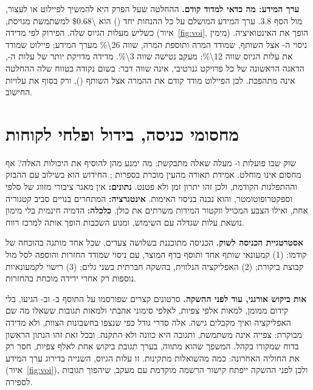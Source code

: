 \textbf{ערך המידע: מה כדאי למדוד קודם.} ההחלטה שעל הפרק היא להמשיך לפיילוט או לעצור, מול הסף \num{3.8}. ערך המידע המושלם על כל ההנחות יחד () הוא \num{\$0.68} למשתמשת מגויסת, כשליש מעלות הגיוס שלה. הפירוק לפי מדידה (איור~\ref{fig:voi}, מימין) הופך את האינטואיציה. ניסוי ה- אצל השותף, שמודד המרה ותוספת המרה, שווה \num{26\%} מערך המידע; פיילוט שמודד את עלות הגיוס שווה \num{12\%}; מעקב נטישה שווה \num{3\%}. מדידה מדויקת יותר של עלות ה-, הדאגה הראשונה של כל פרויקט גנרטיבי, אינה שווה דבר: בשום נקודה בטווח שלה ההחלטה אינה מתהפכת. לכן הפיילוט מודד קודם את ההמרה אצל השותף (), ורק בסוף את עלויות החישוב.

\section{מחסומי כניסה, בידול ופלחי לקוחות}
\label{sec:moat}

שוק שבו פועלות  ו- מעלה שאלה מתבקשת: מה ימנע מהן להוסיף את היכולות האלה? אף מחסום אינו מוחלט. אמידת תאורה מהעין מוכרת בספרות \cite{nishino2004eyes}; החידוש הוא בשילוב עם ההבזק וההתפלגות הקודמת, ולכן זהו יתרון זמן ולא פטנט. \textbf{נתונים:} אין מאגר ציבורי מזווג של סלפי וספקטרופוטומטר, והוא נבנה בניסוי האימות. \textbf{אינטגרציה:} המתחרים בנויים סביב קטגוריה אחת, ואילו הצבע המכויל ווקטור המידות משרתים את כולן. \textbf{כלכלה:} הדמיה חינמית בלי מימון נושאת עלות שגדלה עם השימוש, ומנוע השכבות הופך אותה למרכז רווח.

\textbf{אסטרטגיית הכניסה לשוק.} הכניסה מתוכננת בשלושה צעדים, שכל אחד מותנה בהוכחה של קודמו: (\num{1}) קמעונאי שותף אחד ותוסף בדף המוצר, עם ניסוי  שמודד החזרות והוספה לסל מול קבוצת ביקורת; (\num{2}) האפליקציה הנלווית, בהשקה חברתית בשני גלים; (\num{3}) רישוי לקמעונאיות נוספות רק אחרי ירידה מוכחת בהחזרות.

\textbf{אות ביקוש אורגני, עוד לפני ההשקה.} סרטונים קצרים שפורסמו על התוסף ב- וב- הגיעו, בלי קידום ממומן, למאות אלפי צפיות, לאלפי סימוני אהבתי ולמאות תגובות ששאלו מה שם האפליקציה ואיך מקבלים גישה. אלה סדרי גודל כפי שנצפו בחשבונות הצוות, ולא מדידה מבוקרת: צפייה אינה משתמשת, ותגובה היא כוונה ולא התקנה. ובכל זאת זהו הנתון הראשון בדוח שמקורו בקהל. המשפך שהוא מתווה, בערך תגובת ביקוש אחת לאלף צפיות, חסר רק את החוליה האחרונה: כמה מהשואלות מתקינות. זו עלות הגיוס, השנייה בדירוג ערך המידע (איור~\ref{fig:voi}), ולכן לפני ההשקה ייפתח קישור הרשמה מוקדמת עם מעקב, שיהפוך תגובות לספירה.

